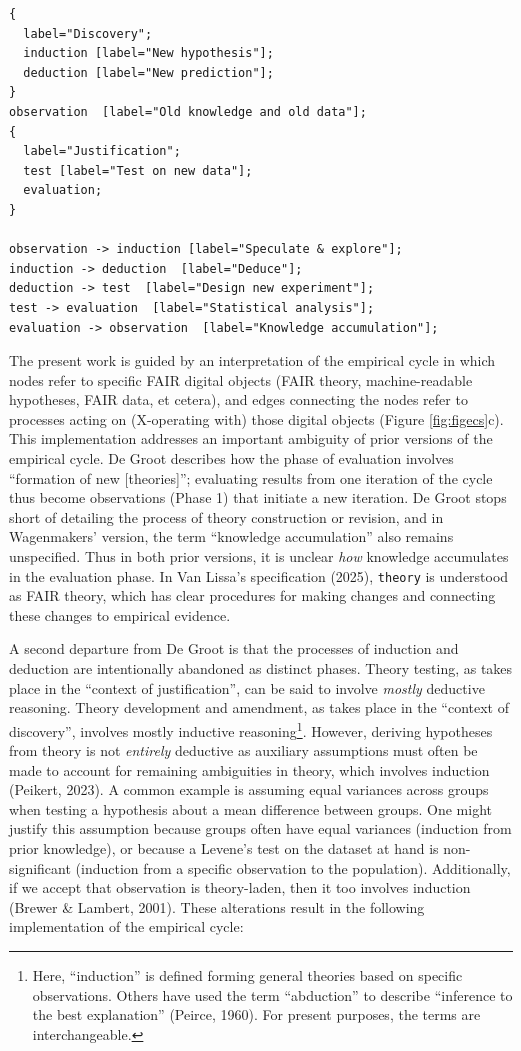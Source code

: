 \documentclass[man]{apa7}
\begin{document}
\begin{verbatim}
{
  label="Discovery";
  induction [label="New hypothesis"];
  deduction [label="New prediction"];
}
observation  [label="Old knowledge and old data"];
{
  label="Justification";
  test [label="Test on new data"];
  evaluation;
}

observation -> induction [label="Speculate & explore"];
induction -> deduction  [label="Deduce"];
deduction -> test  [label="Design new experiment"];
test -> evaluation  [label="Statistical analysis"];
evaluation -> observation  [label="Knowledge accumulation"];
\end{verbatim}

The present work is guided by an interpretation of the empirical cycle in which nodes refer to specific FAIR digital objects (FAIR theory, machine-readable hypotheses, FAIR data, et cetera),
and edges connecting the nodes refer to processes acting on (X-operating with) those digital objects (Figure \ref{fig:figecs}c).
This implementation addresses an important ambiguity of prior versions of the empirical cycle.
De Groot describes how the phase of evaluation involves ``formation of new {[}theories{]}'';
evaluating results from one iteration of the cycle thus become observations (Phase 1) that initiate a new iteration.
De Groot stops short of detailing the process of theory construction or revision,
and in Wagenmakers' version, the term ``knowledge accumulation'' also remains unspecified.
Thus in both prior versions, it is unclear \emph{how} knowledge accumulates in the evaluation phase.
In Van Lissa's specification (2025), \texttt{theory} is understood as FAIR theory,
which has clear procedures for making changes and connecting these changes to empirical evidence.

A second departure from De Groot is that the processes of induction and deduction are intentionally abandoned as distinct phases.
Theory testing, as takes place in the ``context of justification'', can be said to involve \emph{mostly} deductive reasoning.
Theory development and amendment, as takes place in the ``context of discovery'', involves mostly inductive reasoning\footnote{Here, ``induction'' is defined forming general theories based on specific observations. Others have used the term ``abduction'' to describe ``inference to the best explanation'' (Peirce, 1960). For present purposes, the terms are interchangeable.}.
However, deriving hypotheses from theory is not \emph{entirely} deductive
as auxiliary assumptions must often be made to account for remaining ambiguities in theory, which involves induction (Peikert, 2023).
A common example is assuming equal variances across groups when testing a hypothesis about a mean difference between groups.
One might justify this assumption because groups often have equal variances (induction from prior knowledge), or because a Levene's test on the dataset at hand is non-significant (induction from a specific observation to the population).
Additionally, if we accept that observation is theory-laden, then it too involves induction (Brewer \& Lambert, 2001).
These alterations result in the following implementation of the empirical cycle:
\end{document}

